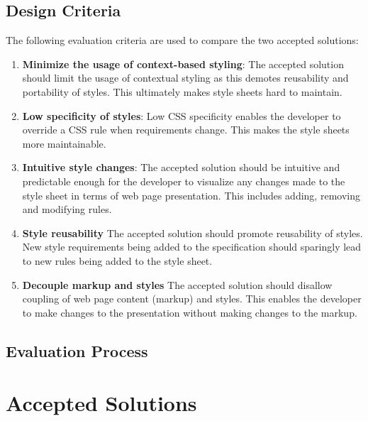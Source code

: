 \documentclass[12pt]{article}
\begin{document}
\subsection{Design Criteria}
The following evaluation criteria are used to compare the two accepted solutions:
\begin{enumerate}

	\item \textbf{Minimize the usage of context-based styling}: The accepted solution should limit the usage of contextual styling as this demotes reusability and portability of styles. This ultimately makes style sheets hard to maintain.

	\item \textbf{Low specificity of styles}: Low CSS specificity enables the developer to override a CSS rule when requirements change. This makes the style sheets more maintainable.

	\item \textbf{Intuitive style changes}: The accepted solution should be intuitive and predictable enough for the developer to visualize any changes made to the style sheet in terms of web page presentation. This includes adding, removing and modifying rules.

	\item \textbf{Style reusability} The accepted solution should promote reusability of styles. New style requirements being added to the specification should sparingly lead to new rules being added to the style sheet.

	\item \textbf{Decouple markup and styles} The accepted solution should disallow coupling of web page content (markup) and styles. This enables the developer to make changes to the presentation without making changes to the markup.

\end{enumerate}

\subsection{Evaluation Process}

\newpage

\section{Accepted Solutions}
\end{document}
